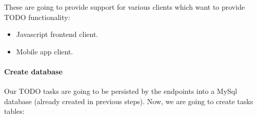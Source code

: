 \documentclass[letterpaper,10pt,english]{sphinxmanual}
\begin{document}
These are going to provide support for various clients which want to provide TODO functionality:
\begin{itemize}
\item {} 
Javascript frontend client.

\item {} 
Mobile app client.

\end{itemize}


\paragraph{Create database}
\label{how_to/todo/step_2_create_api:create-database}
Our TODO tasks are going to be persisted by the endpoints into a MySql database (already created in previous steps). Now,
we are going to create tasks tables:
\end{document}
